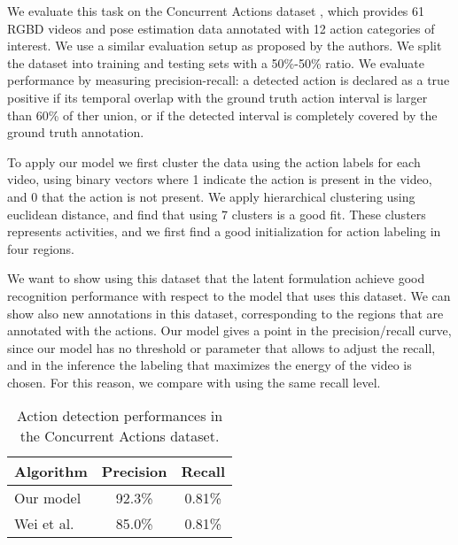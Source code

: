 We evaluate this task on the Concurrent Actions dataset \cite{Wei2013},
which
provides 61 RGBD videos and pose estimation data annotated with 12
action categories of interest.
We use a similar evaluation setup as proposed by the authors.
We split the dataset into training and testing sets with a 50\%-50\% ratio.
We evaluate performance by measuring precision-recall: a detected action
is declared as a true positive if its temporal overlap with the ground
truth action interval is larger than 60\% of ther union, or if
the detected interval is completely covered by the ground truth annotation.


To apply our model we first cluster the data using the action
labels for each video, using binary vectors where 1 indicate the action is
present in the video, and 0 that the action is not present. We apply
hierarchical clustering using euclidean distance, and find that using 7
clusters is a good fit. These clusters represents activities, and we first find
a good initialization for action labeling in four regions.

We want to show using this dataset that the latent formulation achieve good
recognition performance with respect to the model that uses this dataset. We
can show also new annotations in this dataset, corresponding to the regions
that are annotated with the actions. Our model gives a point in the
precision/recall curve, since our model has no threshold or parameter that
allows to adjust the recall, and in the  inference the labeling that maximizes
the energy of the video is chosen. For this reason, we compare with
\cite{Wei2013} using the same recall level.

\begin{table}
\centering
\begin{tabular}{|l|c|c|}
\hline
\textbf{Algorithm} & \textbf{Precision} & \textbf{Recall}\\
\hline
Our model &  92.3\% & 0.81\% \\
\hline
Wei et al. \cite{Wei2013} & 85.0\% & 0.81\% \\
\hline
\end{tabular}
\caption{Action detection performances in the Concurrent Actions dataset. }
\end{table}
 
